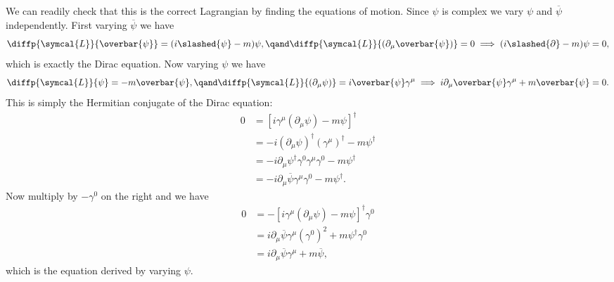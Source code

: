 \documentclass[fleqn]{NotesClass}
\newcommand{\lagrangianDensity}{\symcal{L}}
\newcommand{\hermit}{{\dagger}}
\newcommand{\diracadjoint}[1]{\overbar{#1}}
\begin{document}
    We can readily check that this is the correct Lagrangian by finding the equations of motion.
    Since \(\psi\) is complex we vary \(\psi\) and \(\diracadjoint{\psi}\) independently.
    First varying \(\diracadjoint{\psi}\) we have
    \begin{equation}
        \diffp{\lagrangianDensity}{\diracadjoint{\psi}} = (i\slashed{\psi} - m)\psi, \qand \diffp{\lagrangianDensity}{(\partial_\mu \diracadjoint{\psi})} = 0 \implies (i\slashed{\partial} - m)\psi = 0,
    \end{equation}
    which is exactly the Dirac equation.
    Now varying \(\psi\) we have
    \begin{equation}
        \diffp{\lagrangianDensity}{\psi} = -m\diracadjoint{\psi}, \qand \diffp{\lagrangianDensity}{(\partial_\mu \psi)} = i\diracadjoint{\psi}\gamma^\mu \implies i\partial_\mu\diracadjoint{\psi}\gamma^\mu + m\diracadjoint{\psi} = 0.
    \end{equation}
    This is simply the Hermitian conjugate of the Dirac equation:
    \begin{align}
        0 &= [i\gamma^\mu(\partial_\mu\psi) - m\psi]^\hermit\\
        &= -i(\partial_\mu\psi)^\hermit (\gamma^\mu)^\hermit - m\psi^\hermit\\
        &= -i\partial_\mu\psi^\hermit \gamma^0\gamma^\mu\gamma^0 - m\psi^\hermit\\
        &= -i\partial_\mu\diracadjoint{\psi}\gamma^\mu\gamma^0 - m\psi^\hermit.
    \end{align}
    Now multiply by \(-\gamma^0\) on the right and we have
    \begin{align}
        0 &= -[i\gamma^\mu(\partial_\mu\psi) - m\psi]^\hermit\gamma^0\\
        &= i\partial_\mu\diracadjoint{\psi} \gamma^\mu (\gamma^0)^2 + m\psi^\hermit\gamma^0\\
        &= i\partial_\mu\diracadjoint{\psi} \gamma^\mu + m\diracadjoint{\psi},
    \end{align}
    which is the equation derived by varying \(\psi\).
    
\end{document}
